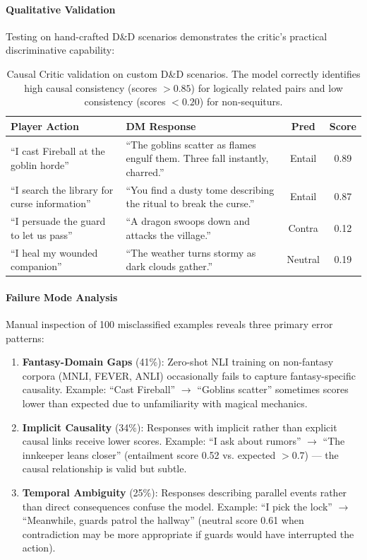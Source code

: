 \documentclass[11pt]{article}
\begin{document}
\paragraph{Qualitative Validation}
Testing on hand-crafted D\&D scenarios demonstrates the critic's practical discriminative capability:

\begin{table}[h]
\centering
\small
\begin{tabular}{p{5cm}p{5cm}cc}
\toprule
\textbf{Player Action} & \textbf{DM Response} & \textbf{Pred} & \textbf{Score} \\
\midrule
``I cast Fireball at the goblin horde'' & ``The goblins scatter as flames engulf them. Three fall instantly, charred.'' & Entail & 0.89 \\
\midrule
``I search the library for curse information'' & ``You find a dusty tome describing the ritual to break the curse.'' & Entail & 0.87 \\
\midrule
``I persuade the guard to let us pass'' & ``A dragon swoops down and attacks the village.'' & Contra & 0.12 \\
\midrule
``I heal my wounded companion'' & ``The weather turns stormy as dark clouds gather.'' & Neutral & 0.19 \\
\bottomrule
\end{tabular}
\caption{Causal Critic validation on custom D\&D scenarios. The model correctly identifies high causal consistency (scores $>0.85$) for logically related pairs and low consistency (scores $<0.20$) for non-sequiturs.}
\end{table}

\paragraph{Failure Mode Analysis}
Manual inspection of 100 misclassified examples reveals three primary error patterns:

\begin{enumerate}
    \item \textbf{Fantasy-Domain Gaps} (41\%): Zero-shot NLI training on non-fantasy corpora (MNLI, FEVER, ANLI) occasionally fails to capture fantasy-specific causality. Example: ``Cast Fireball'' $\rightarrow$ ``Goblins scatter'' sometimes scores lower than expected due to unfamiliarity with magical mechanics.
    
    \item \textbf{Implicit Causality} (34\%): Responses with implicit rather than explicit causal links receive lower scores. Example: ``I ask about rumors'' $\rightarrow$ ``The innkeeper leans closer'' (entailment score 0.52 vs. expected $>0.7$) — the causal relationship is valid but subtle.
    
    \item \textbf{Temporal Ambiguity} (25\%): Responses describing parallel events rather than direct consequences confuse the model. Example: ``I pick the lock'' $\rightarrow$ ``Meanwhile, guards patrol the hallway'' (neutral score 0.61 when contradiction may be more appropriate if guards would have interrupted the action).
\end{enumerate}
\end{document}
